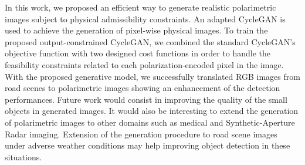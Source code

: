 In this work, we proposed an efficient way to generate realistic polarimetric images subject to physical admissibility constraints. An adapted \ac{CycleGAN} is used to achieve the generation of pixel-wise physical images. To train the proposed output-constrained CycleGAN, we combined the standard \ac{CycleGAN}'s objective function with two designed cost functions in order to handle the feasibility constraints related to each polarization-encoded pixel in the image. 
With the proposed generative model, we successfully translated RGB images from road scenes to polarimetric images showing an enhancement of the detection performances.
Future work would consist in improving the quality of the small objects in generated images. It would also be interesting to extend the generation of polarimetric images to other domains such as medical and Synthetic-Aperture Radar \citep{vanZyl2011} imaging. Extension of the generation procedure to road scene images under adverse weather conditions may help improving object detection in these situations.

